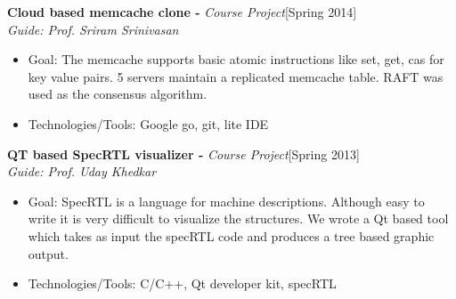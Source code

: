 \documentclass[a4paper,10pt]{article}
\begin{document}
\noindent
\textbf{Cloud based memcache clone -} \emph{Course Project}\hfill[Spring 2014] \\
\emph{Guide: Prof. Sriram Srinivasan}
\begin{itemize}
 \item Goal: The memcache supports basic atomic instructions like set, get, cas for key value pairs. 5 servers maintain a replicated memcache table. RAFT was used as the consensus algorithm.
 \item Technologies/Tools: Google go, git, lite IDE
\end{itemize}

\noindent
\textbf{QT based SpecRTL  visualizer -} \emph{Course Project}\hfill[Spring 2013] \\
\emph{Guide: Prof. Uday Khedkar}
\begin{itemize}
 \item Goal: SpecRTL is a language for machine descriptions. Although easy to write it is very difficult to visualize the structures. We wrote a Qt based tool which takes as input the specRTL code and produces a tree based graphic output.
 \item Technologies/Tools: C/C++, Qt developer kit, specRTL
\end{itemize}
\endgroup
\end{document}
